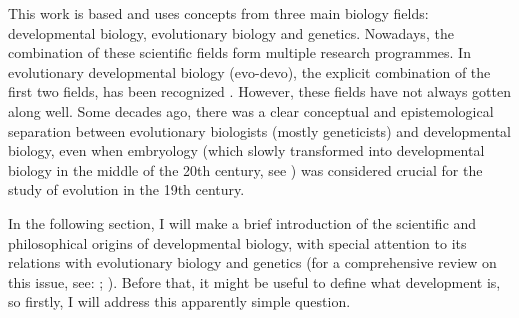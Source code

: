 This work is based and uses concepts from three main biology fields: 
developmental biology, evolutionary biology and genetics.
Nowadays, the combination of these scientific fields form multiple research programmes. 
In evolutionary developmental biology (evo-devo), the explicit combination of the first two fields, has been recognized \citep{Muller2007}.
However, these fields have not always gotten along well. 
Some decades ago, there was a clear conceptual and epistemological separation between evolutionary biologists (mostly geneticists) and developmental biology, even when embryology (which slowly transformed into developmental biology in the middle of the 20th century, see \citealp{Horder2010}) was considered crucial for the study of evolution in the 19th century.

In the following section, I will make a brief introduction of the scientific and philosophical origins of developmental biology, with special attention to its relations with evolutionary biology and genetics (for a comprehensive review on this issue, see: \citealp{amundson2005changing}; \citealp{gilbert1991conceptual}).
Before that, it might be useful to define what development is, so firstly, I will address this apparently simple question.
